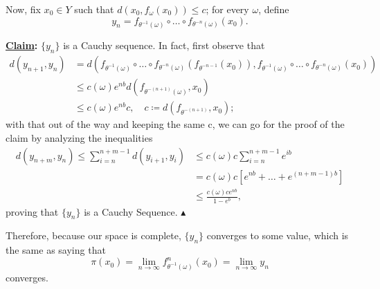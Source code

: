 \documentclass[../stationary_ifs.tex]{subfiles}
\begin{document}
\begin{proof*}
	Now, fix \(x_{0}\in Y\) such that \(d(x_{0}, f_{\omega }(x_{0}))\leq c\); for every \(\omega \), define
	\[
		y_{n}=f_{\theta^{-1}(\omega )}\circ \dotsc \circ f_{\theta^{-n}(\omega )}(x_{0}).
	\]

	\textbf{\underline{Claim}:} \(\{y_{n}\}\) is a Cauchy sequence. In fact, first observe that
	\begin{align*}
		d(y_{n+1}, y_{n}) & = d(f_{\theta^{-1}(\omega )}\circ \dotsc \circ f_{\theta^{-n}(\omega )}(f_{\theta^{-n-1}}(x_{0})),f_{\theta^{-1}(\omega )}\circ \dotsc \circ f_{\theta^{-n}(\omega )}(x_{0})) \\
		                  & \leq c(\omega )e^{nb}d(f_{\theta^{-(n+1)}(\omega )}, x_{0})                                                                                                                   \\
		                  & \leq c(\omega )e^{nb}c, \quad c\coloneqq d(f_{\theta^{-(n+1)}}, x_{0});
	\end{align*}
	with that out of the way and keeping the same c, we can go for the proof of the claim by analyzing the inequalities
	\begin{align*}
		d(y_{n+m}, y_{n})\leq \sum\limits_{i=n}^{n+m-1}d(y_{i+1}, y_{i}) & \leq c(\omega )c\sum\limits_{i=n}^{n+m-1}e^{ib} \\
		                                                                 & = c(\omega )c[e^{nb}+\dotsc +e^{(n+m-1)b}]      \\
		                                                                 & \leq \frac{c(\omega )c e^{nb}}{1-e^{b}},
	\end{align*}
	proving that \(\{y_{n}\}\) is a Cauchy Sequence. \(\blacktriangle\)

	Therefore, because our space is complete, \(\{y_{n}\}\) converges to some value, which is the same as saying that
	\[
		\pi(x_{0}) = \lim_{n\to \infty}f_{\theta^{-1}(\omega )}^{n}(x_{0}) = \lim_{n\to \infty}y_{n}
	\]
	converges. \qedsymbol
\end{proof*}
\end{document}
